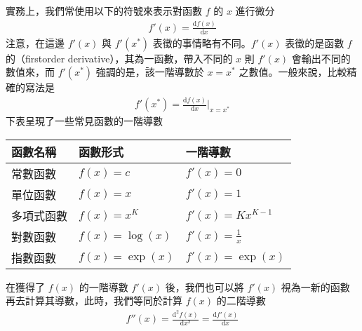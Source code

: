 \documentclass[letterpaper,10pt,english]{sphinxmanual}
\begin{document}
實務上，我們常使用以下的符號來表示對函數 \(f\) 的 \(x\) 進行微分
\begin{equation*}
\begin{split}
f'(x) = \frac{\text{d} f(x)}{\text{d} x}
\end{split}
\end{equation*}
注意，在這邊 \(f'(x)\) 與 \(f'(x^*)\) 表徵的事情略有不同。\(f'(x)\) 表徵的是函數 \(f\) 的（first\sphinxhyphen{}order derivative），其為一函數，帶入不同的 \(x\) 則 \(f'(x)\) 會輸出不同的數值來，而 \(f'(x^*)\) 強調的是，該一階導數於 \(x = x^*\) 之數值。一般來說，比較精確的寫法是
\begin{equation*}
\begin{split}
f'(x^*) = \frac{\text{d} f(x)}{\text{d} x} \bigg|_{x = x^*}
\end{split}
\end{equation*}
下表呈現了一些常見函數的一階導數


\begin{savenotes}\sphinxattablestart
\centering
\begin{tabulary}{\linewidth}[t]{|T|T|T|}
\hline
\sphinxstyletheadfamily 
函數名稱
&\sphinxstyletheadfamily 
函數形式
&\sphinxstyletheadfamily 
一階導數
\\
\hline
常數函數
&
\(f(x)=c\)
&
\(f'(x)=0\)
\\
\hline
單位函數
&
\(f(x)=x\)
&
\(f'(x)=1\)
\\
\hline
多項式函數
&
\(f(x)=x^K\)
&
\(f'(x)=K x^{K-1}\)
\\
\hline
對數函數
&
\(f(x)=\log(x)\)
&
\(f'(x)=\frac{1}{x}\)
\\
\hline
指數函數
&
\(f(x)=\exp(x)\)
&
\(f'(x)=\exp(x)\)
\\
\hline
\end{tabulary}
\par
\sphinxattableend\end{savenotes}

在獲得了 \(f(x)\) 的一階導數 \(f'(x)\) 後，我們也可以將 \(f'(x)\) 視為一新的函數再去計算其導數，此時，我們等同於計算 \(f(x)\) 的二階導數
\begin{equation*}
\begin{split}
f''(x) = \frac{\text{d}^2 f(x)}{\text{d} x^2} = \frac{\text{d} f'(x)}{\text{d} x}
\end{split}
\end{equation*}
\end{document}
